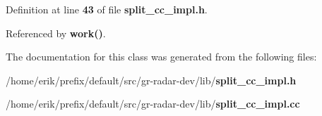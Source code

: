 Definition at line {\bf 43} of file {\bf split\+\_\+cc\+\_\+impl.\+h}.



Referenced by {\bf work()}.



The documentation for this class was generated from the following files\+:\begin{DoxyCompactItemize}
\item 
/home/erik/prefix/default/src/gr-\/radar-\/dev/lib/{\bf split\+\_\+cc\+\_\+impl.\+h}\item 
/home/erik/prefix/default/src/gr-\/radar-\/dev/lib/{\bf split\+\_\+cc\+\_\+impl.\+cc}\end{DoxyCompactItemize}
